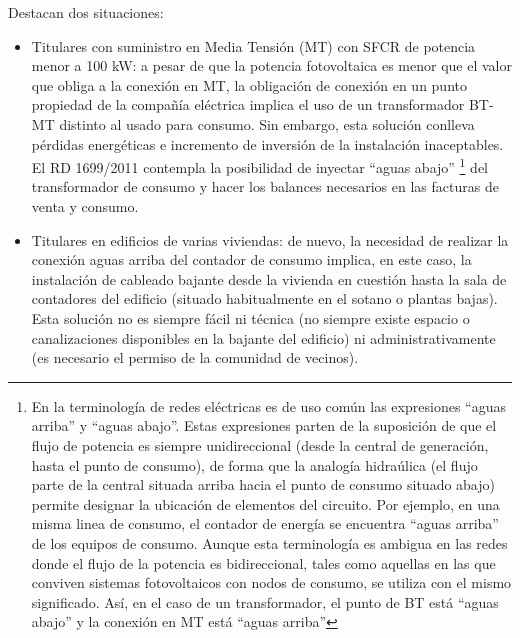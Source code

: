 Destacan dos situaciones:
\begin{itemize}
\item Titulares con suministro en Media Tensión (MT) con SFCR de
  potencia menor a 100 kW: a pesar de que la potencia fotovoltaica es
  menor que el valor que obliga a la conexión en MT, la obligación de
  conexión en un punto propiedad de la compañía eléctrica implica el
  uso de un transformador BT-MT distinto al usado para consumo. Sin
  embargo, esta solución conlleva pérdidas energéticas e incremento de
  inversión de la instalación inaceptables. El RD 1699/2011 contempla
  la posibilidad de inyectar ``aguas abajo''%
  \footnote{En la terminología de redes eléctricas es de uso común las
    expresiones {}``aguas arriba'' y {}``aguas abajo''. Estas
    expresiones parten de la suposición de que el flujo de potencia es
    siempre unidireccional (desde la central de generación, hasta el
    punto de consumo), de forma que la analogía hidraúlica (el flujo
    parte de la central situada arriba hacia el punto de consumo
    situado abajo) permite designar la ubicación de elementos del
    circuito. Por ejemplo, en una misma linea de consumo, el contador
    de energía se encuentra {}``aguas arriba'' de los equipos de
    consumo. Aunque esta terminología es ambigua en las redes donde el
    flujo de la potencia es bidireccional, tales como aquellas en las
    que conviven sistemas fotovoltaicos con nodos de consumo, se
    utiliza con el mismo significado. Así, en el caso de un
    transformador, el punto de BT está ``aguas abajo'' y la conexión
    en MT está ``aguas arriba''%
  } del transformador de consumo y hacer los balances necesarios en
  las facturas de venta y consumo.

\item Titulares en edificios de varias viviendas: de nuevo, la
  necesidad de realizar la conexión aguas arriba del contador de
  consumo implica, en este caso, la instalación de cableado bajante
  desde la vivienda en cuestión hasta la sala de contadores del
  edificio (situado habitualmente en el sotano o plantas bajas). Esta
  solución no es siempre fácil ni técnica (no siempre existe espacio o
  canalizaciones disponibles en la bajante del edificio) ni
  administrativamente (es necesario el permiso de la comunidad de
  vecinos). 
\end{itemize}

